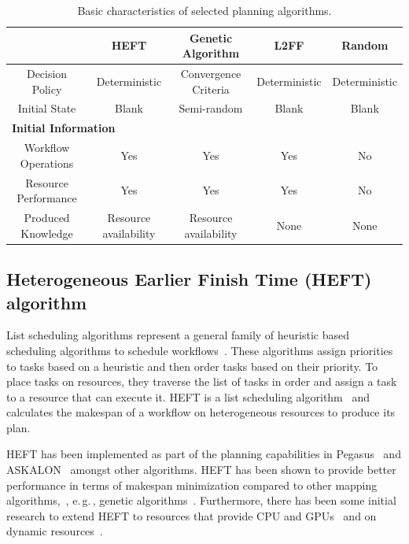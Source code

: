 \begin{table}[t]
    \centering
    \scriptsize
    \begin{tabular}{@{}ccccc@{}}
        \toprule
        &\textbf{HEFT}     &\textbf{Genetic Algorithm} &\textbf{L2FF} & \textbf{Random} \\
        \midrule
        Decision Policy   &Deterministic &Convergence Criteria &Deterministic& Deterministic\\
        Initial State    &Blank &Semi-random &Blank & Blank\\
        \midrule
        \multicolumn{5}{l}{\textbf{Initial Information}}\\\midrule
        Workflow Operations &Yes & Yes & Yes & No\\
        Resource Performance &Yes &Yes &Yes & No\\
        \midrule
        Produced Knowledge& Resource availability& Resource availability&None&None\\
        \bottomrule
    \end{tabular}
    \caption{Basic characteristics of selected planning algorithms.\label{tab:sched_algo}}
\end{table}

\subsection{Heterogeneous Earlier Finish Time (HEFT) algorithm}
\label{algo:heft}
List scheduling algorithms represent a general family of heuristic based
scheduling algorithms to schedule
workflows~\cite{dong2006scheduling,list_sched_wiki}. These algorithms assign
priorities to tasks based on a heuristic and then order tasks based on their
priority. To place tasks on resources, they traverse the list of tasks in
order and assign a task to a resource that can execute it. HEFT is a list
scheduling algorithm~\cite{dong2006scheduling} and calculates the makespan of
a workflow on heterogeneous resources to produce its plan.

HEFT has been implemented as part of the planning capabilities in
Pegasus~\cite{deelman2015pegasus} and ASKALON~\cite{fahringer2005askalon}
amongst other algorithms. HEFT has been shown to provide better performance in
terms of makespan minimization compared to other mapping
algorithms,~\cite{topcuoglu2002performance,canon2008comparative}, e.\,g.\,,
genetic algorithms~\cite{fahringer2005askalon}. Furthermore, there has been
some initial research to extend HEFT to resources that provide CPU and
GPUs~\cite{shetti2013optimization} and on dynamic
resources~\cite{dong2007pfas}.


